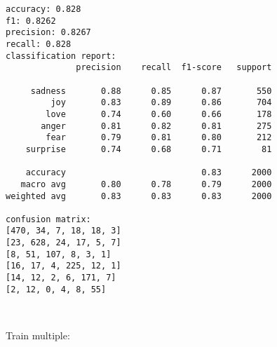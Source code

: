 \documentclass[8pt]{extarticle}
\begin{document}
\begin{Verbatim}[commandchars=\\\{\}]
accuracy: 0.828
f1: 0.8262
precision: 0.8267
recall: 0.828
classification report:
              precision    recall  f1-score   support

     sadness       0.88      0.85      0.87       550
         joy       0.83      0.89      0.86       704
        love       0.74      0.60      0.66       178
       anger       0.81      0.82      0.81       275
        fear       0.79      0.81      0.80       212
    surprise       0.74      0.68      0.71        81

    accuracy                           0.83      2000
   macro avg       0.80      0.78      0.79      2000
weighted avg       0.83      0.83      0.83      2000

confusion matrix:
[470, 34, 7, 18, 18, 3]
[23, 628, 24, 17, 5, 7]
[8, 51, 107, 8, 3, 1]
[16, 17, 4, 225, 12, 1]
[14, 12, 2, 6, 171, 7]
[2, 12, 0, 4, 8, 55]

    \end{Verbatim}

    \begin{center}
    \end{center}
    { \hspace*{\fill} \\}
    
    Train multiple:
\end{document}
